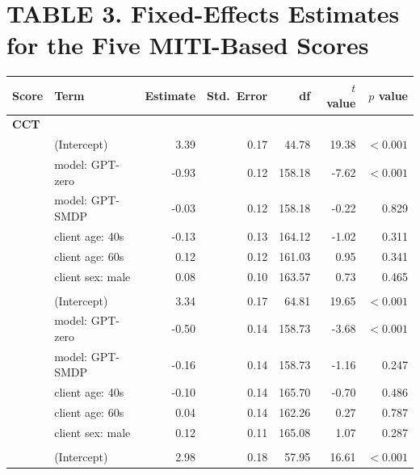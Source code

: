 \documentclass{wiley-article}
\begin{document}
\begin{table}[htbp] %
  \section*{TABLE 3. Fixed-Effects Estimates for the Five MITI-Based Scores}
  \centering
  \footnotesize
  \begin{threeparttable}
    \label{tab:miti_fixed_effects}
    \begin{tabular}{llrrrrr}
      \toprule
      \textbf{Score} & \textbf{Term} & \textbf{Estimate} & \textbf{Std.\ Error} & \textbf{df} & \textbf{$t$ value} & \textbf{$p$ value} \\
      \midrule
      \multicolumn{7}{l}{\textbf{CCT}}\\
        & (Intercept)                       &  3.39 & 0.17 &  44.78 &  19.38 & $<\!0.001$ \\
        & model: GPT-zero          & -0.93 & 0.12 & 158.18 &  -7.62 & $<\!0.001$ \\
        & model: GPT-SMDP           & -0.03 & 0.12 & 158.18 &  -0.22 & 0.829 \\
        & client age: 40s                   & -0.13 & 0.13 & 164.12 &  -1.02 & 0.311 \\
        & client age: 60s                   &  0.12 & 0.12 & 161.03 &   0.95 & 0.341 \\
        & client sex: male                  &  0.08 & 0.10 & 163.57 &   0.73 & 0.465 \\
      \addlinespace
      \multicolumn{7}{l}{\textbf{SST}}\\
        & (Intercept)                       &  3.34 & 0.17 &  64.81 &  19.65 & $<\!0.001$ \\
        & model: GPT-zero          & -0.50 & 0.14 & 158.73 &  -3.68 & $<\!0.001$ \\
        & model: GPT-SMDP           & -0.16 & 0.14 & 158.73 &  -1.16 & 0.247 \\
        & client age: 40s                   & -0.10 & 0.14 & 165.70 &  -0.70 & 0.486 \\
        & client age: 60s                   &  0.04 & 0.14 & 162.26 &   0.27 & 0.787 \\
        & client sex: male                  &  0.12 & 0.11 & 165.08 &   1.07 & 0.287 \\
      \addlinespace
      \multicolumn{7}{l}{\textbf{PAR}}\\
        & (Intercept)                       &  2.98 & 0.18 &  57.95 &  16.61 & $<\!0.001$ \\

\end{tabular}
\end{threeparttable}
\end{table}
\end{document}
